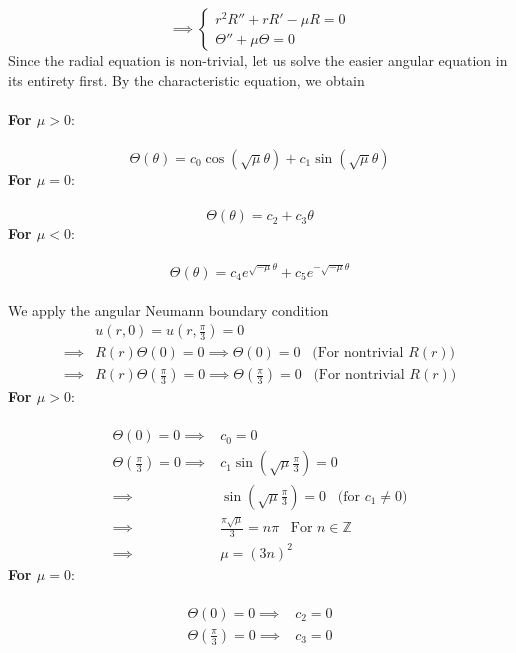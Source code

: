 \documentclass[12pt]{article}
\begin{document}
{$$ \implies \begin{cases}
r^2 R'' + r R' - \mu R = 0 \\
\Theta'' + \mu \Theta= 0
\end{cases}$$
Since the radial equation is non-trivial, let us solve the easier angular equation in its entirety first. By the characteristic equation, we obtain \\ \\
\textbf{For $\mu > 0$}: \\ \\
$$\Theta(\theta) = c_0 \cos \left( \sqrt{\mu} \theta \right) + c_1 \sin \left( \sqrt{\mu} \theta \right)$$
\textbf{For $\mu = 0$}: \\ \\
$$\Theta(\theta) = c_2 + c_3 \theta$$
\textbf{For $\mu < 0$}: \\ \\
$$\Theta(\theta) = c_4 e^{\sqrt{-\mu} \theta} +c_5 e^{-\sqrt{-\mu} \theta} $$  \\
We apply the angular Neumann boundary condition
\begin{align*}
& u(r,0) = u\left (r,\frac{\pi}{3} \right)  = 0 \\ 
\implies& R(r) \Theta(0) = 0 \implies \Theta(0) = 0 \;\;\; \text{(For nontrivial $R(r)$)} \\
\implies& R(r) \Theta \left( \frac{\pi}{3} \right) = 0 \implies \Theta \left( \frac{\pi}{3} \right) = 0 \;\;\; \text{(For nontrivial $R(r)$)}
\end{align*}
\textbf{For $\mu > 0$}: \\ \\
\begin{align*}
\Theta(0) = 0 \implies& \boxed{c_0 = 0} \\
\Theta \left( \frac{\pi}{3} \right) = 0 \implies& c_1 \sin \left( \sqrt{\mu} \frac{\pi}{3} \right) = 0 \\
\implies& \sin \left( \sqrt{\mu} \frac{\pi}{3} \right) = 0 \;\;\; \text{(for $c_1 \neq 0$)} \\
\implies& \frac{\pi \sqrt{\mu}}{3} = n\pi \;\;\; \text{For $n \in \mathbb{Z}$} \\
\implies& \boxed{\mu = (3n)^2}
\end{align*}
\textbf{For $\mu = 0$}: \\ \\
\begin{align*}
\Theta(0) = 0 \implies& \boxed{c_2 = 0} \\
\Theta \left( \frac{\pi}{3} \right) = 0 \implies& \boxed{c_3 = 0}

\end{align*}}
\end{document}

